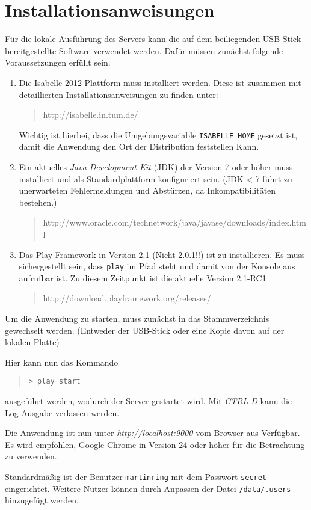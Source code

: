 \chapter{Installationsanweisungen}
\label{sec:install}

Für die lokale Ausführung des Servers kann die auf dem beiliegenden USB-Stick bereitgestellte
Software verwendet werden. Dafür müssen zunächst folgende Voraussetzungen erfüllt sein.

\begin{enumerate}
  \item Die Isabelle 2012 Plattform muss installiert werden. Diese ist zusammen mit detaillierten 
  Installationsanweisungen zu finden unter:
  \begin{quote}
  http://isabelle.in.tum.de/
  \end{quote}
  Wichtig ist hierbei, dass die Umgebungsvariable \texttt{ISABELLE\_HOME} gesetzt ist, damit die 
  Anwendung den Ort der Distribution feststellen Kann.
  \item Ein aktuelles \textit{Java Development Kit} (JDK) der Version 7 oder höher muss installiert und als 
  Standardplattform konfiguriert sein. (JDK < 7 führt zu unerwarteten Fehlermeldungen und Abstürzen, 
  da Inkompatibilitäten bestehen.)
  \begin{quote}
  http://www.oracle.com/technetwork/java/javase/downloads/index.html
  \end{quote}
  \item Das Play Framework in Version 2.1 (Nicht 2.0.1!!) ist zu installieren. Es muss 
  sichergestellt sein, dass \texttt{play} im Pfad steht und damit von der Konsole aus aufrufbar ist. 
  Zu diesem Zeitpunkt ist die aktuelle Version 2.1-RC1
  \begin{quote}
  http://download.playframework.org/releases/
  \end{quote}
\end{enumerate}

Um die Anwendung zu starten, muss zunächst in das Stammverzeichnis gewechselt werden. (Entweder der
USB-Stick oder eine Kopie davon auf der lokalen Platte)

Hier kann nun das Kommando

\begin{quote}
\texttt{> play start}
\end{quote}

ausgeführt werden, wodurch der Server gestartet wird. Mit \textit{CTRL-D} kann die Log-Ausgabe
verlassen werden.

Die Anwendung ist nun unter \textit{http://localhost:9000} vom Browser aus Verfügbar. Es wird
empfohlen, Google Chrome in Version 24 oder höher für die Betrachtung zu verwenden.

Standardmäßig ist der Benutzer \texttt{martinring} mit dem Passwort \texttt{secret} eingerichtet.
Weitere Nutzer können durch Anpassen der Datei \texttt{/data/.users} hinzugefügt werden.